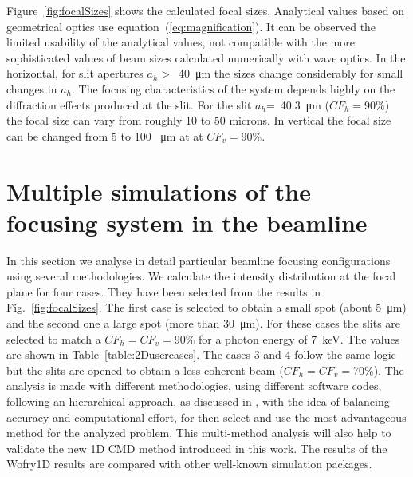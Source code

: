\documentclass{iucr}              %
\begin{document}
Figure~\ref{fig:focalSizes} shows the calculated focal sizes. Analytical values based on geometrical optics use  equation~(\ref{eq:magnification}). It can be observed the limited usability of the analytical values, not compatible with the more sophisticated values of beam sizes calculated numerically with wave optics. In the horizontal, for slit apertures $a_h>$~\SI{40}{\micro\meter} the sizes change considerably for small changes in $a_h$. The focusing characteristics of the system depends highly on the diffraction effects produced at the slit. For the slit $a_h$=~\SI{40.3}{\micro\meter} ($CF_h=$90\%) the focal size can vary from roughly 10 to 50 microns.  In vertical the focal size can be changed from 5 to 100 \SI{}{\micro\meter} at at $CF_v=$90\%.


\section{Multiple simulations of the focusing system in the beamline}
\label{sec:complete-beamline}

In this section we analyse in detail particular beamline focusing configurations using several methodologies. We calculate the intensity distribution at the focal plane for four cases. They have been selected from the results in Fig.~\ref{fig:focalSizes}. The first case is selected to obtain a small spot (about \SI{5}{\micro\meter}) and the second one a large spot (more than \SI{30}{\micro\meter}).  For these cases the slits are selected to match a $CF_h=CF_v=$90\% for a photon energy of \SI{7}{keV}. The values are shown in Table~\ref{table:2Dusercases}. The cases 3 and 4 follow the same logic but the slits are opened to obtain a less coherent beam ($CF_h=CF_v=$70\%). The analysis is made with different methodologies, using different software codes, following an hierarchical approach, as discussed in \cite{hierarchical}, with the idea of balancing accuracy and computational effort, for then select and use the most advantageous method for the analyzed problem. This multi-method analysis will also help to validate the new 1D CMD method introduced in this work. The results of the Wofry1D results are compared with other well-known simulation packages. 
\end{document}
